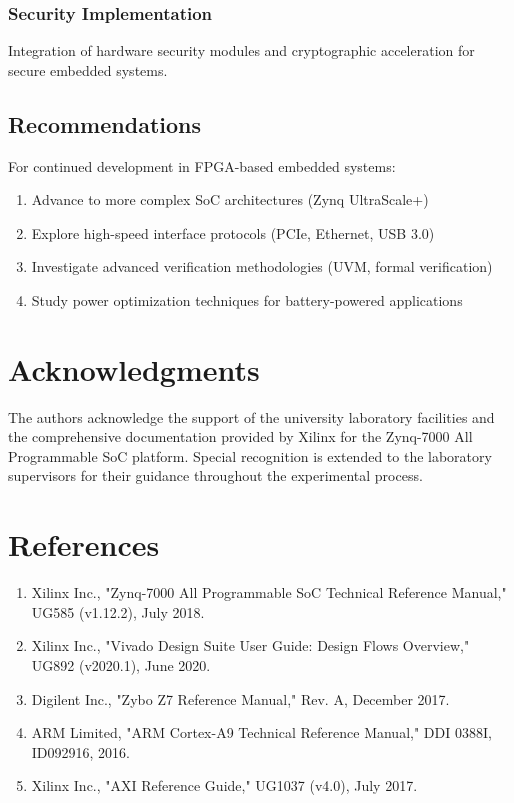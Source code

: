 \documentclass[11pt,a4paper]{article}
\begin{document}
\subsubsection{Security Implementation}
Integration of hardware security modules and cryptographic acceleration for secure embedded systems.

\subsection{Recommendations}

For continued development in FPGA-based embedded systems:

\begin{enumerate}[leftmargin=*]
    \item Advance to more complex SoC architectures (Zynq UltraScale+)
    \item Explore high-speed interface protocols (PCIe, Ethernet, USB 3.0)
    \item Investigate advanced verification methodologies (UVM, formal verification)
    \item Study power optimization techniques for battery-powered applications
\end{enumerate}

\section*{Acknowledgments}

The authors acknowledge the support of the university laboratory facilities and the comprehensive documentation provided by Xilinx for the Zynq-7000 All Programmable SoC platform. Special recognition is extended to the laboratory supervisors for their guidance throughout the experimental process.

\section*{References}

\begin{enumerate}[leftmargin=*]
    \item Xilinx Inc., "Zynq-7000 All Programmable SoC Technical Reference Manual," UG585 (v1.12.2), July 2018.
    \item Xilinx Inc., "Vivado Design Suite User Guide: Design Flows Overview," UG892 (v2020.1), June 2020.
    \item Digilent Inc., "Zybo Z7 Reference Manual," Rev. A, December 2017.
    \item ARM Limited, "ARM Cortex-A9 Technical Reference Manual," DDI 0388I, ID092916, 2016.
    \item Xilinx Inc., "AXI Reference Guide," UG1037 (v4.0), July 2017.
\end{enumerate}
\end{document}
